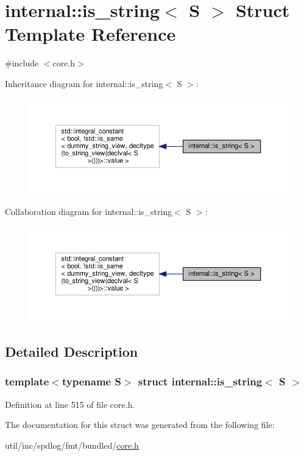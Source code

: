 \hypertarget{structinternal_1_1is__string}{}\section{internal\+:\+:is\+\_\+string$<$ S $>$ Struct Template Reference}
\label{structinternal_1_1is__string}


{\ttfamily \#include $<$core.\+h$>$}



Inheritance diagram for internal\+:\+:is\+\_\+string$<$ S $>$\+:
\nopagebreak
\begin{figure}[H]
\begin{center}
\leavevmode
\includegraphics[width=350pt]{structinternal_1_1is__string__inherit__graph}
\end{center}
\end{figure}


Collaboration diagram for internal\+:\+:is\+\_\+string$<$ S $>$\+:
\nopagebreak
\begin{figure}[H]
\begin{center}
\leavevmode
\includegraphics[width=350pt]{structinternal_1_1is__string__coll__graph}
\end{center}
\end{figure}


\subsection{Detailed Description}
\subsubsection*{template$<$typename S$>$\newline
struct internal\+::is\+\_\+string$<$ S $>$}



Definition at line 515 of file core.\+h.



The documentation for this struct was generated from the following file\+:\begin{DoxyCompactItemize}
\item 
util/inc/spdlog/fmt/bundled/\hyperlink{core_8h}{core.\+h}\end{DoxyCompactItemize}
